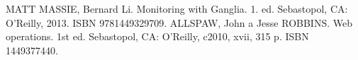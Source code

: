 \documentclass[a4paper, usesections, upjsfrontpage, thesismargins, thesislinespacing, twoside]{rnthesissvk}
\begin{document}
\renewcommand{\bibname}{Zoznam pou�itej literat�ry}
\begin{thebibliography}{9}
	 MATT MASSIE, Bernard Li. Monitoring with Ganglia. 1. ed. Sebastopol, CA: O'Reilly, 2013. ISBN 9781449329709.
	 ALLSPAW, John a Jesse ROBBINS. Web operations. 1st ed. Sebastopol, CA: O'Reilly, c2010, xvii, 315 p. ISBN 1449377440.
\end{thebibliography}
%
\end{document}
